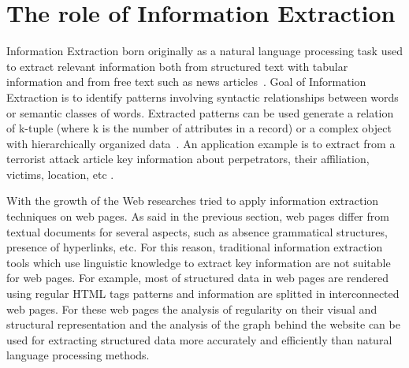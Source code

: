 \section{The role of Information Extraction}
\label{sec:The role of Information Extraction}
\color{red}
Information Extraction born originally as a natural language processing task used to extract relevant information both from structured text with tabular information and from free text such as news articles~\cite{Eikvil:1999}. Goal of Information Extraction is to identify patterns involving syntactic relationships between words or semantic classes of words. Extracted patterns can be used generate a relation of k-tuple (where k is the number of attributes in a record) or a complex object with hierarchically organized data~\cite{Chang:2006}.
An application example is to extract from a terrorist attack article key information about perpetrators, their affiliation, victims, location, etc \cite{Pio:2014}. 

With the growth of the Web researches tried to apply information extraction techniques on web pages. %
As said in the previous section, web pages differ from textual documents for several aspects, such as absence grammatical structures, presence of hyperlinks, etc.
For this reason, traditional information extraction tools which use linguistic knowledge to extract key information are not suitable for web pages. For example, most of structured data in web pages are rendered using regular HTML tags patterns and information are splitted in interconnected web pages. For these web pages the analysis of regularity on their visual and structural representation and the analysis of the graph behind the website can be used for extracting structured data more accurately and efficiently than natural language processing methods. 

